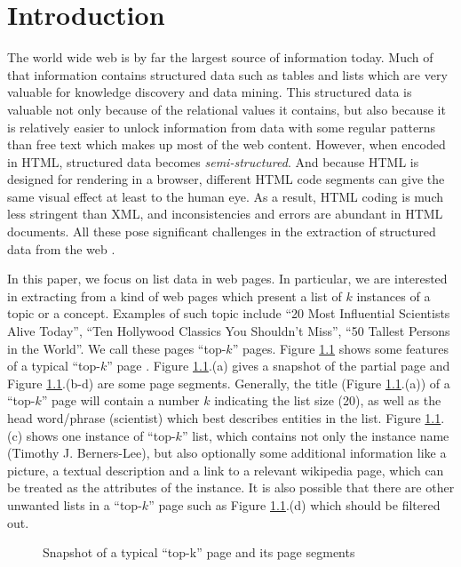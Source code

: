 \chapter{Introduction}
\label{sec:intro}
The world wide web is by far the largest source of information today.
Much of that information contains structured data such as tables and lists
which are very valuable for knowledge discovery and data mining.
This structured data is valuable not only because of the relational
values it contains, but also because it is relatively easier to unlock
information from data with some regular patterns than free text which
makes up most of the web content. However, when encoded in HTML,
structured data becomes {\em semi-structured}.
And because HTML is designed for rendering in a browser, different
HTML code segments can give the same visual effect at least to
the human eye. As a result,
HTML coding is much less stringent than XML, and
inconsistencies and errors are abundant in HTML documents.
All these pose significant challenges in the extraction of structured
data from the web \cite{Weninger10:UnexpectedList}.

In this paper, we focus on list data in web pages. In particular, we are
interested in extracting from a kind of web pages which present
a list of $k$ instances of a topic or a concept. Examples of such topic include
``20 Most Influential Scientists Alive Today'',
``Ten Hollywood Classics You Shouldn't Miss'',
``50 Tallest Persons in the World''.
We call these pages ``top-$k$'' pages.
Figure \ref{fig:topscientists}
shows some features of a typical ``top-$k$'' page \cite{InfluentialScientists}.
Figure \ref{fig:topscientists}.(a) gives a snapshot of the partial page
and Figure \ref{fig:topscientists}.(b-d) are some page segments.
Generally, the title (Figure \ref{fig:topscientists}.(a)) of a ``top-$k$'' page
will contain a number $k$ indicating the list size (20),
as well as the head word/phrase (scientist) which best describes entities in
the list. Figure \ref{fig:topscientists}.(c) shows one instance
of ``top-$k$'' list, which contains not only  the instance name
(Timothy J. Berners-Lee), but also optionally some additional information like
a picture, a textual description and a link to a relevant wikipedia page,
which can be treated as the attributes of the instance.
It is also possible that there are other unwanted lists in a ``top-$k$'' page
such as Figure \ref{fig:topscientists}.(d) which
should be filtered out.

\begin{figure}[th]
        \centering
        \caption{Snapshot of a typical  ``top-k'' page
	\cite{InfluentialScientists} and its page segments}
        \label{fig:topscientists}
\end{figure}

